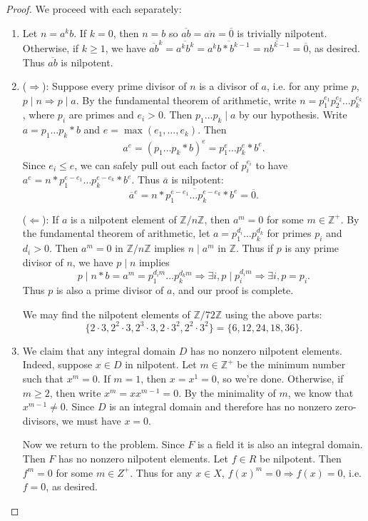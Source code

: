 \documentclass[12pt]{article}
\theoremstyle{remark}
\theoremstyle{named}
\newcommand{\Z}{\mathbb Z}
\begin{document}
\begin{proof}
    We proceed with each separately: 
    \begin{enumerate}
        \item Let \(n = a^kb\). If \(k = 0\), then \(n = b\) so \(\overline{ab} = \overline{an} = \overline{0}\) is trivially nilpotent. 
        Otherwise, if \(k \ge 1\), we have \(\overline{ab}^k = \overline{a^kb^k} = \overline{a^k b * b^{k - 1}} = \overline{nb^{k - 1}} = \overline{0}\), as desired. Thus \(\overline{ab}\) is nilpotent.

        \item (\(\Rightarrow\)): Suppose every prime divisor of \(n\) is a divisor of \(a\), i.e. for any prime \(p\), \(p \mid n \Rightarrow p \mid a\). By the fundamental theorem of arithmetic, write \(n = p_1^{e_1} p_2^{e_2} \dots p_k^{e_k}\), where \(p_i\) are primes and \(e_i > 0\). Then \(p_1 \dots p_k \mid a\) by our hypothesis. Write \(a = p_1 \dots p_k * b\) and \(e = \max(e_1, \dots, e_k)\). Then 
        \begin{align*}
            a^e = (p_1 \dots p_k * b)^e = p_1^e \dots p_k^e * b^e.
        \end{align*}
        Since \(e_i \le e\), we can safely pull out each factor of \(p_i^{e_i}\) to have \(a^e = n * p_1^{e - e_1} \dots p_k^{e - e_k} * b^e\). Thus \(\overline{a}\) is nilpotent:
        \[\overline{a}^e = \overline{n * p_1^{e - e_1} \dots p_k^{e - e_k} * b^e} = \overline{0}.\]

        (\(\Leftarrow\)): If \(a\) is a nilpotent element of \(\Z /n\Z\), then \(a^m = 0\) for some \(m \in \Z^+\). By the fundamental theorem of arithmetic, let \(a = p_1^{d_i} \dots p_k^{d_k}\) for primes \(p_i\) and \(d_i > 0\). Then \(a^m = 0\) in \(\Z / n\Z\) implies \(n \mid a^m\) in \(\Z\). Thus if \(p\) is any prime divisor of \(n\), we have \(p \mid n\) implies 
        \[p \mid n * b = a^m = p_1^{d_i m} \dots p_k^{d_k m} \Rightarrow \exists i, p \mid p_i^{d_i m} \Rightarrow \exists i, p = p_i.\]
        Thus \(p\) is also a prime divisor of \(a\), and our proof is complete.
        
        We may find the nilpotent elements of \(\Z / 72\Z\) using the above parts:
        $$\{2 \cdot 3, 2^2 \cdot 3, 2^3 \cdot 3, 2 \cdot 3^2, 2^2 \cdot 3^2\} = \{6, 12, 24, 18, 36\}.$$
        \item We claim that any integral domain \(D\) has no nonzero nilpotent elements. Indeed, suppose \(x \in D\) in nilpotent. Let \(m \in \Z^+\) be the minimum number such that \(x^m = 0\). If \(m = 1\), then \(x = x^1 = 0\), so we're done. Otherwise, if \(m \ge 2\), then write \(x^m = x x^{m - 1} = 0\). By the minimality of \(m\), we know that \(x^{m - 1} \neq 0\). Since \(D\) is an integral domain and therefore has no nonzero zero-divisors, we must have \(x = 0\).
        
        Now we return to the problem. Since \(F\) is a field it is also an integral domain. Then \(F\) has no nonzero nilpotent elements. Let \(f \in R\) be nilpotent. Then \(f^m = 0\) for some \(m \in Z^+\). Thus for any \(x \in X\), \(f(x)^m = 0 \Rightarrow f(x) = 0\), i.e. \(f = 0\), as desired.
    \end{enumerate}
\end{proof}
\end{document}
